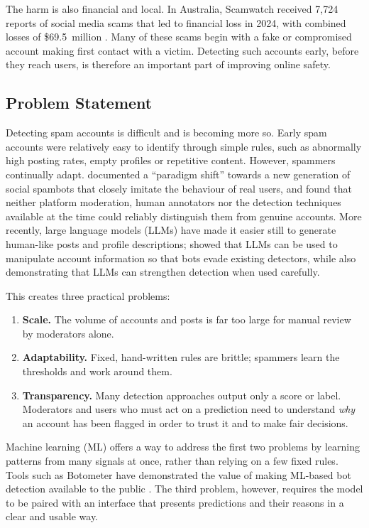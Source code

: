 The harm is also financial and local. In Australia, Scamwatch received 7,724 reports of social media scams that led to financial loss in 2024, with combined losses of \$69.5~million \parencite{nasc2025scamlosses}. Many of these scams begin with a fake or compromised account making first contact with a victim. Detecting such accounts early, before they reach users, is therefore an important part of improving online safety.

\subsection{Problem Statement}\label{sec:problem}

Detecting spam accounts is difficult and is becoming more so. Early spam accounts were relatively easy to identify through simple rules, such as abnormally high posting rates, empty profiles or repetitive content. However, spammers continually adapt. \textcite{cresci2017paradigm} documented a \enquote{paradigm shift} towards a new generation of social spambots that closely imitate the behaviour of real users, and found that neither platform moderation, human annotators nor the detection techniques available at the time could reliably distinguish them from genuine accounts. More recently, large language models (LLMs) have made it easier still to generate human-like posts and profile descriptions; \textcite{feng2024botsay} showed that LLMs can be used to manipulate account information so that bots evade existing detectors, while also demonstrating that LLMs can strengthen detection when used carefully.

This creates three practical problems:

\begin{enumerate}[nosep]
  \item \textbf{Scale.} The volume of accounts and posts is far too large for manual review by moderators alone.
  \item \textbf{Adaptability.} Fixed, hand-written rules are brittle; spammers learn the thresholds and work around them.
  \item \textbf{Transparency.} Many detection approaches output only a score or label. Moderators and users who must act on a prediction need to understand \emph{why} an account has been flagged in order to trust it and to make fair decisions.
\end{enumerate}

Machine learning (ML) offers a way to address the first two problems by learning patterns from many signals at once, rather than relying on a few fixed rules. Tools such as Botometer have demonstrated the value of making ML-based bot detection available to the public \parencite{yang2019arming}. The third problem, however, requires the model to be paired with an interface that presents predictions and their reasons in a clear and usable way.

